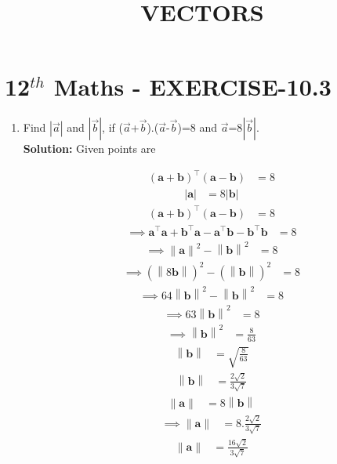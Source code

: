 \documentclass[10pt]{article}
\newcommand{\solution}{\noindent \textbf{Solution: }}
\providecommand{\norm}[1]{\left\lVert#1\right\rVert}
\providecommand{\abs}[1]{\left\vert#1\right\vert}
\let\vec\mathbf{}
\begin{document}
\begin{center}
\title{\textbf{VECTORS}}
\date{\vspace{-5ex}} %
\maketitle
\end{center}

\section{12$^{th}$ Maths - EXERCISE-10.3}

\begin{enumerate}
\item Find $\abs{\overrightarrow{a}}$ and $\abs{\overrightarrow{b}}$, if ($\overrightarrow{a}$+$\overrightarrow{b}$)$.$($\overrightarrow{a}$-$\overrightarrow{b}$)=8 and ${\overrightarrow{a}}$=8$\abs{\overrightarrow{b}}$.\\  

\solution
Given  points are

\begin{align}
(\vec{a}+\vec{b})^{\top}(\vec{a}-\vec{b})&=8
\end{align}
\begin{align}
\abs{\vec{a}}&=8\abs{\vec{b}}
\end{align}
\begin{align}
(\vec{a}+\vec{b})^{\top}(\vec{a}-\vec{b})&=8
\end{align}
\begin{align}
\implies\vec{a}^{\top}\vec{a}+\vec{b}^{\top}\vec{a}-\vec{a}^{\top}\vec{b}-\vec{b}^{\top}\vec{b}&=8
\end{align}
\begin{align}
\implies\norm{\vec{a}}^2-\norm{\vec{b}}^2&=8
\end{align}
\begin{align}
\implies(\norm{8\vec{b}})^2-(\norm{\vec{b}})^2&=8
\end{align}
\begin{align}
\implies64{\norm{\vec{b}}}^2-\norm{\vec{b}}^2&=8
\end{align}
\begin{align}
\implies63{\norm{\vec{b}}}^2&=8
\end{align}
\begin{align}
\implies\norm{\vec{b}}^2&=\frac{8}{63}
\end{align}
\begin{align}
\norm{\vec{b}}&=\sqrt{\frac{8}{63}}
\end{align}
\begin{align}
\norm{\vec{b}}&=\frac{2\sqrt{2}}{3\sqrt{7}}
\end{align}
\begin{align}
\norm{\vec{a}}&=8\norm{\vec{b}}
\end{align}
\begin{align}
\implies\norm{\vec{a}}&=8.\frac{2\sqrt{2}}{3\sqrt{7}}
\end{align}
\begin{align}
\norm{\vec{a}}&=\frac{16\sqrt{2}}{3\sqrt{7}}
\end{align}
\end{enumerate}
\end{document}
